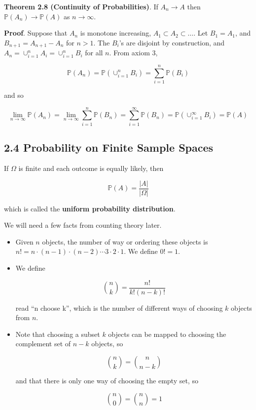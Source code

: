 \textbf{Theorem 2.8 (Continuity of Probabilities)}. If
\(A_n \rightarrow A\) then \(\mathbb{P}(A_n) \rightarrow \mathbb{P}(A)\)
as \(n \rightarrow \infty\).

\textbf{Proof}. Suppose that \(A_n\) is monotone increasing,
\(A_1 \subset A_2 \subset \dots\). Let \(B_1 = A_1\), and
\(B_{n+1} = A_{n+1} - A_n\) for \(n > 1\). The \(B_i\)'s are disjoint by
construction, and \(A_n = \cup_{i=1}^n A_i = \cup_{i=1}^n B_i\) for all
\(n\). From axiom 3,

\[ \mathbb{P}(A_n) = \mathbb{P}\left( \cup_{i=1}^n B_i \right)  = \sum_{i=1}^n \mathbb{P}(B_i) \]

and so

\[ \lim_{n \rightarrow \infty} \mathbb{P}(A_n) = \lim_{n \rightarrow \infty} \sum_{i=1}^n \mathbb{P}(B_n) = \sum_{i=1}^\infty \mathbb{P}(B_n) = \mathbb{P}\left( \cup_{i=1}^\infty B_i \right) = \mathbb{P}(A) \]

\subsection{2.4 Probability on Finite Sample
Spaces}\label{probability-on-finite-sample-spaces}

If \(\Omega\) is finite and each outcome is equally likely, then

\[ \mathbb{P}(A) = \frac{|A|}{|\Omega|} \]

which is called the \textbf{uniform probability distribution}.

We will need a few facts from counting theory later.

\begin{itemize}
\item
  Given \(n\) objects, the number of way or ordering these objects is
  \(n! = n \cdot (n - 1) \cdot (n - 2) \cdots 3 \cdot 2 \cdot 1\). We
  define \(0! = 1\).
\item
  We define

  \[ \binom{n}{k} = \frac{n!}{k! (n - k)!} \]

  read ``n choose k'', which is the number of different ways of choosing
  \(k\) objects from \(n\).
\item
  Note that choosing a subset \(k\) objects can be mapped to choosing
  the complement set of \(n - k\) objects, so

  \[ \binom{n}{k} = \binom{n}{n - k} \]

  and that there is only one way of choosing the empty set, so

  \[ \binom{n}{0} = \binom{n}{n} = 1\]
\end{itemize}


